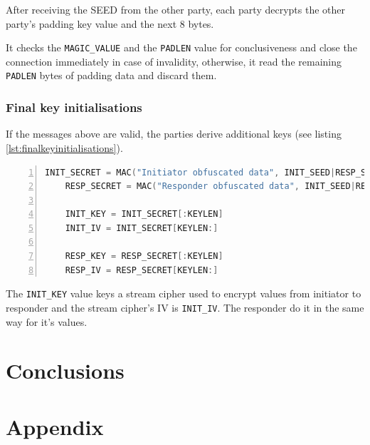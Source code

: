 \documentclass[sigconf, screen]{acmart}
\begin{document}
After receiving the SEED from the other party, each party decrypts the other party's padding key value and the next 8 bytes.

It checks the \lstinline[language=C]{MAGIC_VALUE} and the \lstinline[language=C]{PADLEN} value for conclusiveness and close the connection immediately in case of invalidity, otherwise, it read the remaining \lstinline[language=C]{PADLEN} bytes of padding data and discard them.
\subsubsection{Final key initialisations}
\label{sss:finalkeyinitialisation}
If the messages above are valid, the parties derive additional keys (see listing \ref{lst:finalkeyinitialisations}).

\begin{lstlisting}[language=C,  tabsize=4, numbers=left, xleftmargin=5.0ex, basicstyle=\footnotesize, breakatwhitespace=false, breaklines=true, frame=tb, caption=Final key initialisations \cite{TorGitWebObfs2Specification}., label=lst:finalkeyinitialisations]
    INIT_SECRET = MAC("Initiator obfuscated data", INIT_SEED|RESP_SEED)
    RESP_SECRET = MAC("Responder obfuscated data", INIT_SEED|RESP_SEED)

    INIT_KEY = INIT_SECRET[:KEYLEN]
    INIT_IV = INIT_SECRET[KEYLEN:]

    RESP_KEY = RESP_SECRET[:KEYLEN]
    RESP_IV = RESP_SECRET[KEYLEN:]
\end{lstlisting}

The \lstinline[language=C]{INIT_KEY} value keys a stream cipher used to encrypt values from initiator to responder and the stream cipher's IV is \lstinline[language=C]{INIT_IV}. The responder do it in the same way for it's values.
\section{Conclusions}
\label{s:conclusions}
\appendix
\section{Appendix}
\label{s:appendix}


\end{document}
